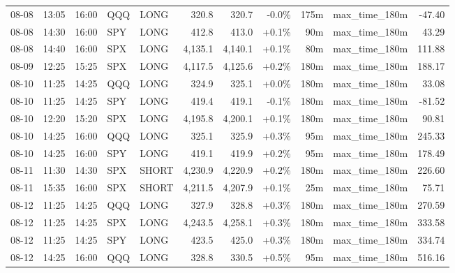 \documentclass[11pt,a4paper,twoside]{article}
\begin{document}
\begin{center}
\begin{longtable}{>{\color{txtmain}}l l l l l r r r r >{\color{txtmain}}l r}
08-08 & 13:05 & 16:00 & QQQ & LONG & 320.8 & 320.7 & \textcolor{lossred}{-0.0\%} & 175m & max\_time\_180m & \textcolor{lossred}{-47.40} \\
08-08 & 14:30 & 16:00 & SPY & LONG & 412.8 & 413.0 & \textcolor{wingreen}{+0.1\%} & 90m & max\_time\_180m & \textcolor{wingreen}{43.29} \\
08-08 & 14:40 & 16:00 & SPX & LONG & 4,135.1 & 4,140.1 & \textcolor{wingreen}{+0.1\%} & 80m & max\_time\_180m & \textcolor{wingreen}{111.88} \\
08-09 & 12:25 & 15:25 & SPX & LONG & 4,117.5 & 4,125.6 & \textcolor{wingreen}{+0.2\%} & 180m & max\_time\_180m & \textcolor{wingreen}{188.17} \\
08-10 & 11:25 & 14:25 & QQQ & LONG & 324.9 & 325.1 & \textcolor{wingreen}{+0.0\%} & 180m & max\_time\_180m & \textcolor{wingreen}{33.08} \\
08-10 & 11:25 & 14:25 & SPY & LONG & 419.4 & 419.1 & \textcolor{lossred}{-0.1\%} & 180m & max\_time\_180m & \textcolor{lossred}{-81.52} \\
08-10 & 12:20 & 15:20 & SPX & LONG & 4,195.8 & 4,200.1 & \textcolor{wingreen}{+0.1\%} & 180m & max\_time\_180m & \textcolor{wingreen}{90.81} \\
08-10 & 14:25 & 16:00 & QQQ & LONG & 325.1 & 325.9 & \textcolor{wingreen}{+0.3\%} & 95m & max\_time\_180m & \textcolor{wingreen}{245.33} \\
08-10 & 14:25 & 16:00 & SPY & LONG & 419.1 & 419.9 & \textcolor{wingreen}{+0.2\%} & 95m & max\_time\_180m & \textcolor{wingreen}{178.49} \\
08-11 & 11:30 & 14:30 & SPX & SHORT & 4,230.9 & 4,220.9 & \textcolor{wingreen}{+0.2\%} & 180m & max\_time\_180m & \textcolor{wingreen}{226.60} \\
08-11 & 15:35 & 16:00 & SPX & SHORT & 4,211.5 & 4,207.9 & \textcolor{wingreen}{+0.1\%} & 25m & max\_time\_180m & \textcolor{wingreen}{75.71} \\
08-12 & 11:25 & 14:25 & QQQ & LONG & 327.9 & 328.8 & \textcolor{wingreen}{+0.3\%} & 180m & max\_time\_180m & \textcolor{wingreen}{270.59} \\
08-12 & 11:25 & 14:25 & SPX & LONG & 4,243.5 & 4,258.1 & \textcolor{wingreen}{+0.3\%} & 180m & max\_time\_180m & \textcolor{wingreen}{333.58} \\
08-12 & 11:25 & 14:25 & SPY & LONG & 423.5 & 425.0 & \textcolor{wingreen}{+0.3\%} & 180m & max\_time\_180m & \textcolor{wingreen}{334.74} \\
08-12 & 14:25 & 16:00 & QQQ & LONG & 328.8 & 330.5 & \textcolor{wingreen}{+0.5\%} & 95m & max\_time\_180m & \textcolor{wingreen}{516.16} \\

\end{longtable}
\end{center}
\end{document}
